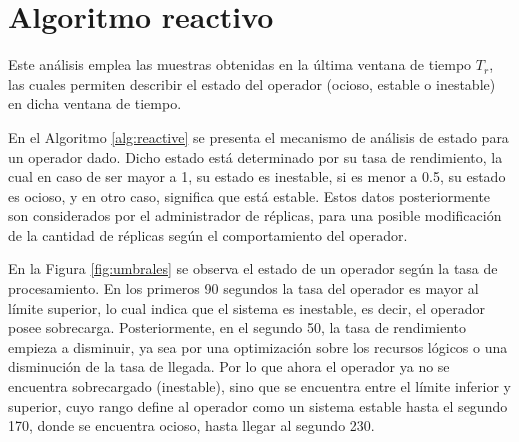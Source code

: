 
\section{Algoritmo reactivo}


\normalsize{Este an\'alisis emplea las muestras obtenidas en la \'ultima ventana de tiempo $T_r$, las cuales permiten describir el estado del operador (ocioso, estable o inestable) en dicha ventana de tiempo.}

En el Algoritmo \ref{alg:reactive} se presenta el mecanismo de an\'alisis de estado para un operador dado. Dicho estado est\'a determinado por su tasa de rendimiento, la cual en caso de ser mayor a 1, su estado es inestable, si es menor a 0.5, su estado es ocioso, y en otro caso, significa que est\'a estable. Estos datos posteriormente son considerados por el administrador de r\'eplicas, para una posible modificaci\'on de la cantidad de r\'eplicas seg\'un el comportamiento del operador.

En la Figura \ref{fig:umbrales} se observa el estado de un operador según la tasa de procesamiento. En los primeros 90 segundos la tasa del operador es mayor al límite superior, lo cual indica que el sistema es inestable, es decir, el operador posee sobrecarga. Posteriormente, en el segundo 50, la tasa de rendimiento empieza a disminuir, ya sea por una optimización sobre los recursos lógicos o una disminución de la tasa de llegada. \normalsize{Por lo que ahora el operador ya no se encuentra sobrecargado (inestable), sino que se encuentra entre el límite inferior y superior, cuyo rango define al operador como un sistema estable hasta el segundo 170, donde se encuentra ocioso, hasta llegar al segundo 230.}

